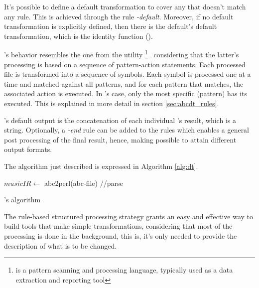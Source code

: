 It's possible to define a default transformation to cover any \abcelement{} that doesn't match any
rule. This is achieved through the rule \emph{-default}. Moreover, if no default transformation is
explicitly defined, then there is the default's default transformation, which is the identity
function (\toabc{}).

\dt{}'s behavior resembles the one from the utility \awk{}\footnote{\awk{} is a pattern scanning and
processing language, typically used as a data extraction and reporting tool}~\cite{awk:Online}
considering that the latter's processing is based on a sequence of pattern-action statements. Each
processed file is transformed into a sequence of symbols. Each symbol is processed one at a time and
matched against all patterns, and for each pattern that matches, the associated action is executed.
In \abcdt{}'s case, only the most specific \actuator{} (pattern) has its \transformation{} executed.
This is explained in more detail in section \ref{sec:abcdt_rules}.

\dt{}'s default output is the concatenation of each individual \transformation{}'s result, which is a
string. Optionally, a \emph{-end} rule can be added to the rules which enables a general post
processing of the final result, hence, making possible to attain different output formats.

The algorithm just described is expressed in Algorithm \ref{alg:dt}.

\begin{algorithm}
  $musicIR \gets$ abc2perl(abc-file) \hfill //parse\\
  \caption{\dt{}'s algorithm}
  \label{alg:dt}
\end{algorithm}

The rule-based structured processing strategy grants an easy and effective way to build tools that
make simple transformations, considering that most of the processing is done in the background, this
is, it's only needed to provide the description of what is to be changed.


